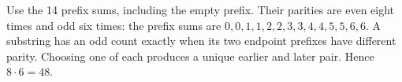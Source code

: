Use the 14 prefix sums, including the empty prefix. Their parities are even eight times and odd six times: the prefix sums are $0,0,1,1,2,2,3,3,4,4,5,5,6,6$. A substring has an odd count exactly when its two endpoint prefixes have different parity. Choosing one of each produces a unique earlier and later pair. Hence $\boxed{8\cdot6=48}$.
